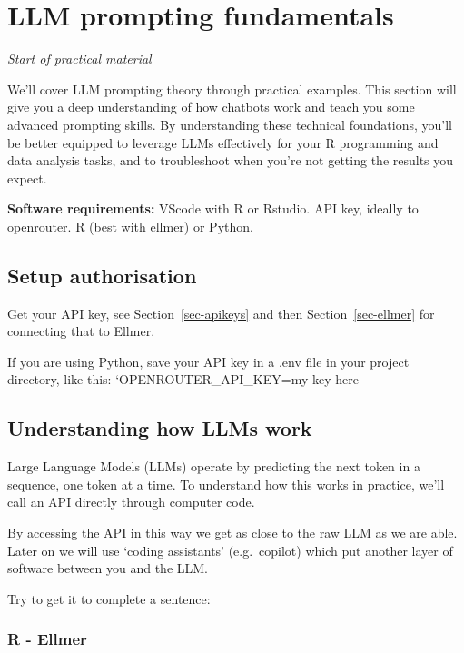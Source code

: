 \documentclass[
  letterpaper,
  DIV=11,
  numbers=noendperiod]{scrreprt}
\begin{document}

\chapter{LLM prompting fundamentals}\label{llm-prompting-fundamentals}

\emph{Start of practical material}

We'll cover LLM prompting theory through practical examples. This
section will give you a deep understanding of how chatbots work and
teach you some advanced prompting skills. By understanding these
technical foundations, you'll be better equipped to leverage LLMs
effectively for your R programming and data analysis tasks, and to
troubleshoot when you're not getting the results you expect.

\textbf{Software requirements:} VScode with R or Rstudio. API key,
ideally to openrouter. R (best with ellmer) or Python.

\section{Setup authorisation}\label{setup-authorisation}

Get your API key, see Section~\ref{sec-apikeys} and then
Section~\ref{sec-ellmer} for connecting that to Ellmer.

If you are using Python, save your API key in a .env file in your
project directory, like this: `OPENROUTER\_API\_KEY=my-key-here

\section{Understanding how LLMs work}\label{understanding-how-llms-work}

Large Language Models (LLMs) operate by predicting the next token in a
sequence, one token at a time. To understand how this works in practice,
we'll call an API directly through computer code.

By accessing the API in this way we get as close to the raw LLM as we
are able. Later on we will use `coding assistants' (e.g.~copilot) which
put another layer of software between you and the LLM.

Try to get it to complete a sentence:

\subsection{R - Ellmer}
\end{document}

